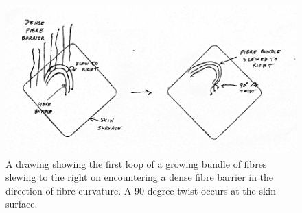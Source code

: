 %

\begin{figure}[!h]
  \centering
  \includegraphics[width=1.1\textwidth]{fig13bfilt.png}
  \caption{A drawing showing the first loop of a growing bundle of fibres slewing to the right on encountering a dense fibre barrier in the direction of fibre curvature. A 90 degree twist occurs at the skin surface.}
  \label{twist1}
\end{figure}

%


